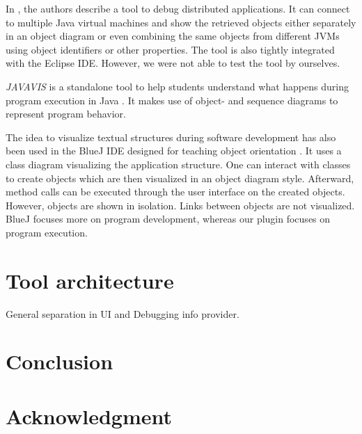\documentclass[conference]{IEEEtran}
\begin{document}
In \cite{kochGraphicalDebuggingDistributed2015}, the authors describe a tool to debug distributed applications.
It can connect to multiple Java virtual machines and show the retrieved objects either separately in an object diagram or even combining the same objects from different JVMs using object identifiers or other properties.
The tool is also tightly integrated with the Eclipse IDE.
However, we were not able to test the tool by ourselves.

\textit{JAVAVIS} is a standalone tool to help students understand what happens during program execution in Java \cite{oechsleJAVAVISAutomaticProgram2002}.
It makes use of object- and sequence diagrams to represent program behavior.

The idea to visualize textual structures during software development has also been used in the BlueJ IDE designed for teaching object orientation \cite{kollingBlueJSystemIts2003,kollingObjectorientedProgramDevelopment1996}.
It uses a class diagram visualizing the application structure.
One can interact with classes to create objects which are then visualized in an object diagram style.
Afterward, method calls can be executed through the user interface on the created objects.
However, objects are shown in isolation.
Links between objects are not visualized.
BlueJ focuses more on program development, whereas our plugin focuses on program execution.


\section{Tool architecture}
General separation in UI and Debugging info provider.

\section{Conclusion}

\section*{Acknowledgment}



\end{document}
